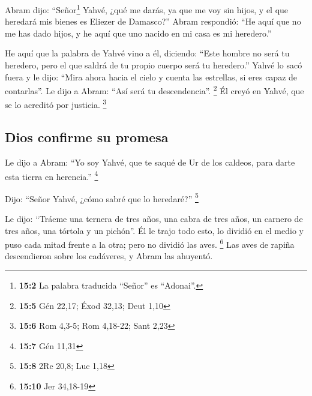  Abram dijo: ``Señor\footnote{\textbf{15:2} La palabra
  traducida ``Señor'' es ``Adonai''.} Yahvé, ¿qué me darás, ya que me
voy sin hijos, y el que heredará mis bienes es Eliezer de Damasco?''
 Abram respondió: ``He aquí que no me has dado hijos, y he
aquí que uno nacido en mi casa es mi heredero.''

 He aquí que la palabra de Yahvé vino a él, diciendo:
``Este hombre no será tu heredero, pero el que saldrá de tu propio
cuerpo será tu heredero.''  Yahvé lo sacó fuera y le dijo:
``Mira ahora hacia el cielo y cuenta las estrellas, si eres capaz de
contarlas''. Le dijo a Abram: ``Así será tu descendencia''. \footnote{\textbf{15:5}
  Gén 22,17; Éxod 32,13; Deut 1,10}  Él creyó en Yahvé,
que se lo acreditó por justicia. \footnote{\textbf{15:6} Rom 4,3-5; Rom
  4,18-22; Sant 2,23}

\hypertarget{dios-confirme-su-promesa}{%
\subsection{Dios confirme su promesa}\label{dios-confirme-su-promesa}}

 Le dijo a Abram: ``Yo soy Yahvé, que te saqué de Ur de
los caldeos, para darte esta tierra en herencia.'' \footnote{\textbf{15:7}
  Gén 11,31}

 Dijo: ``Señor Yahvé, ¿cómo sabré que lo heredaré?''
\footnote{\textbf{15:8} 2Re 20,8; Luc 1,18}

 Le dijo: ``Tráeme una ternera de tres años, una cabra de
tres años, un carnero de tres años, una tórtola y un pichón''.
 Él le trajo todo esto, lo dividió en el medio y puso
cada mitad frente a la otra; pero no dividió las aves. \footnote{\textbf{15:10}
  Jer 34,18-19}  Las aves de rapiña descendieron sobre
los cadáveres, y Abram las ahuyentó.

